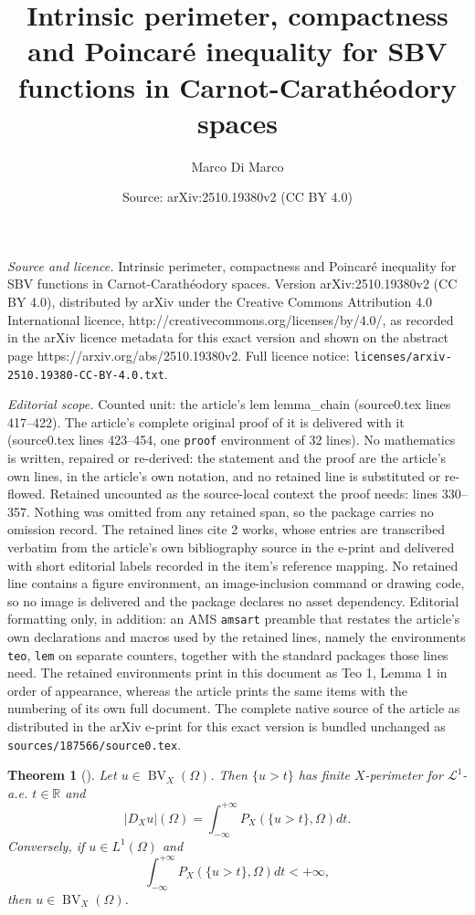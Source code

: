 \documentclass[10pt,a4paper]{amsart}
\title{Intrinsic perimeter, compactness and Poincaré inequality for SBV functions in Carnot-Carathéodory spaces}
\author{Marco Di Marco}
\date{Source: arXiv:2510.19380v2 (CC BY 4.0)}
\newtheorem{teo}{Theorem}
\newcommand{\R}{\mathbb{R}}
\newcommand{\bv}{\operatorname{BV}}
\newcommand{\leb}{\mathcal{L}}
\begin{document}
\maketitle

\noindent\emph{Source and licence.} Intrinsic perimeter, compactness and Poincaré inequality for SBV functions in Carnot-Carathéodory spaces. Version arXiv:2510.19380v2 (CC BY 4.0), distributed by arXiv under the Creative Commons Attribution 4.0 International licence, http://creativecommons.org/licenses/by/4.0/, as recorded in the arXiv licence metadata for this exact version and shown on the abstract page https://arxiv.org/abs/2510.19380v2. Full licence notice: \texttt{licenses/arxiv-2510.19380-CC-BY-4.0.txt}.\par\smallskip

\noindent\textit{Editorial scope.} Counted unit: the article's lem lemma\_chain (source0.tex lines 417--422). The article's complete original proof of it is delivered with it (source0.tex lines 423--454, one \texttt{proof} environment of 32 lines). No mathematics is written, repaired or re-derived: the statement and the proof are the article's own lines, in the article's own notation, and no retained line is substituted or re-flowed.  Retained uncounted as the source-local context the proof needs: lines 330--357.  Nothing was omitted from any retained span, so the package carries no omission record.  The retained lines cite 2 works, whose entries are transcribed verbatim from the article's own bibliography source in the e-print and delivered with short editorial labels recorded in the item's reference mapping.  No retained line contains a figure environment, an image-inclusion command or drawing code, so no image is delivered and the package declares no asset dependency.  Editorial formatting only, in addition: an AMS \texttt{amsart} preamble that restates the article's own declarations and macros used by the retained lines, namely the environments \texttt{teo}, \texttt{lem} on separate counters, together with the standard packages those lines need.  The retained environments print in this document as Teo 1, Lemma 1 in order of appearance, whereas the article prints the same items with the numbering of its own full document.  The complete native source of the article as distributed in the arXiv e-print for this exact version is bundled unchanged as \texttt{sources/187566/source0.tex}.
\begin{teo}[{\cite[Theorem 2.3.5]{fssc}}]\label{teo_coarea1}
Let $u \in \bv_X(\Omega)$. Then $\{u>t\}$ has finite $X$-perimeter for $\leb^1$-a.e. $t \in \R$ and
\[
|D_Xu|(\Omega)=\int_{-\infty}^{+\infty} P_X(\{u >t\},\Omega)dt.
\]
Conversely, if $u \in L^1(\Omega)$ and 
\[
\int_{-\infty}^{+\infty} P_X(\{u >t\},\Omega)dt<+\infty,
\]
then $u \in \bv_X(\Omega)$.
\end{teo}
\end{document}
